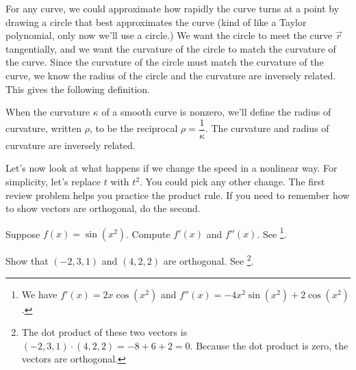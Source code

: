 For any curve, we could approximate how rapidly the curve turns at a point by drawing a circle that best approximates the curve (kind of like a Taylor polynomial, only now we'll use a circle.) We want the circle to meet the curve $\vec r$ tangentially, and we want the curvature of the circle to match the curvature of the curve. Since the curvature of the circle must match the curvature of the curve, we know the radius of the circle and the curvature are inversely related.  This gives the following definition.

\begin{definition}%
When the curvature $\kappa$ of a smooth curve is nonzero, we'll define the radius of curvature, written $\rho$, to be the reciprocal $\rho = \dfrac{1}{\kappa}$. The curvature and radius of curvature are inversely related. 
\end{definition}



Let's now look at what happens if we change the speed in a nonlinear way.  For simplicity, let's replace $t$ with $t^2$.  You could pick any other change. The first review problem helps you practice the product rule. If you need to remember how to show vectors are orthogonal, do the second.

\begin{review*}
 Suppose $f(x) = \sin(x^2)$.  Compute $f'(x)$ and $f''(x)$.  See 
\footnote{
We have $f'(x) = 2x\cos(x^2)$ and $f''(x) = -4x^2\sin(x^2)+2\cos(x^2)$.
}.
\end{review*}
\begin{review*}
 Show that $(-2,3,1)$ and $(4,2,2)$ are orthogonal. See 
\footnote{The dot product of these two vectors is 
$(-2,3,1)\cdot(4,2,2) = -8+6+2=0$. Because the dot product is zero, the vectors are orthogonal.
}.
\end{review*}



